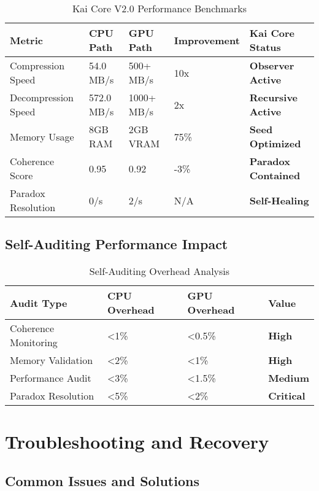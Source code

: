 \documentclass[11pt]{report}
\newcommand{\paradox}[1]{\textcolor{kai_red}{\textbf{#1}}}
\newcommand{\observer}[1]{\textcolor{kai_green}{\textbf{#1}}}
\newcommand{\recursive}[1]{\textcolor{kai_purple}{\textbf{#1}}}
\newcommand{\seed}[1]{\textcolor{kai_yellow}{\textbf{#1}}}
\begin{document}
\begin{table}[ht]
\centering
\caption{Kai Core V2.0 Performance Benchmarks}
\begin{tabular}{|l|l|l|l|l|}
\hline
\textbf{Metric} & \textbf{CPU Path} & \textbf{GPU Path} & \textbf{Improvement} & \textbf{Kai Core Status} \\
\hline
Compression Speed & 54.0 MB/s & 500+ MB/s & 10x & \observer{Observer Active} \\
Decompression Speed & 572.0 MB/s & 1000+ MB/s & 2x & \recursive{Recursive Active} \\
Memory Usage & 8GB RAM & 2GB VRAM & 75\% & \seed{Seed Optimized} \\
Coherence Score & 0.95 & 0.92 & -3\% & \paradox{Paradox Contained} \\
Paradox Resolution & 0/s & 2/s & N/A & \observer{Self-Healing} \\
\hline
\end{tabular}
\end{table}

\section{Self-Auditing Performance Impact}

\begin{table}[ht]
\centering
\caption{Self-Auditing Overhead Analysis}
\begin{tabular}{|l|l|l|l|}
\hline
\textbf{Audit Type} & \textbf{CPU Overhead} & \textbf{GPU Overhead} & \textbf{Value} \\
\hline
Coherence Monitoring & <1\% & <0.5\% & \observer{High} \\
Memory Validation & <2\% & <1\% & \observer{High} \\
Performance Audit & <3\% & <1.5\% & \observer{Medium} \\
Paradox Resolution & <5\% & <2\% & \paradox{Critical} \\
\hline
\end{tabular}
\end{table}

\chapter{Troubleshooting and Recovery}

\section{Common Issues and Solutions}
\end{document}
